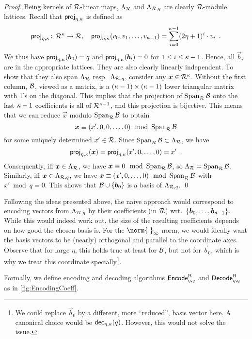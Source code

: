 \begin{proof}
Being kernels of $\mathcal{R}$-linear maps, $\Lambda_{\mathcal{R}}$ and $\Lambda_{\mathcal{R},q}$ are clearly $\mathcal{R}$-module lattices. Recall that $\mathsf{proj}_{\eta,\kappa}$ is defined as
\[
\mathsf{proj}_{\eta,\kappa}\colon\,\mathcal{R}^\kappa\to\mathcal{R}, \quad \mathsf{proj}_{\eta,\kappa}(v_0,v_1,\ldots, v_{\kappa-1}) = \sum_{i=0}^{\kappa-1} (2\eta+1)^i \cdot v_i\enspace.
\]
We thus have $\mathsf{proj}_{\eta,\kappa}(\boldsymbol{b}_0) = q$ and $\mathsf{proj}_{\eta,\kappa}(\boldsymbol{b}_i) = 0$ for $1\leq i \leq \kappa-1$.
Hence, all $\vec{b}_i$ are in the appropriate lattices.
They are also clearly linearly independent.
To show that they also span $\Lambda_{\mathcal{R}}$ resp.\ $\Lambda_{\mathcal{R},q}$, consider any $\boldsymbol{x}\in\mathcal{R}^\kappa$.
Without the first column, $\mathcal{B}$, viewed as a matrix, is a $(\kappa-1)\times (\kappa-1)$ lower triangular matrix with 1's on the diagonal.
This implies that the projection of $\operatorname*{Span}_{\mathcal{R}}\mathcal{B}$ onto the last $\kappa-1$ coefficients is all of $\mathcal{R}^{\kappa-1}$, and this projection is bijective.
This means that we can reduce $\vec{x}$ modulo $\operatorname*{Span}_{\mathcal{R}} \mathcal{B}$ to obtain
\[
  \boldsymbol{x}\equiv (x',0,0,\ldots, 0) \mod {\operatorname*{Span}}\nolimits_{\mathcal{R}}\mathcal{B}
\]
for some uniquely determined $x'\in\mathcal{R}$.
Since $\operatorname*{Span}_{\mathcal{R}}\mathcal{B}\subset \Lambda_{\mathcal{R}}$, we have 
\[
 \mathsf{proj}_{\eta,\kappa}(\boldsymbol{x}) = \mathsf{proj}_{\eta,\kappa}(x',0,\ldots, 0) = x'\enspace. 
\]
Consequently, iff $\boldsymbol{x}\in\Lambda_{\mathcal{R}}$, we have $\boldsymbol{x}\equiv 0 \mod {\operatorname*{Span}}_{\mathcal{R}}\mathcal{B}$, so $\Lambda_{\mathcal{R}} = \operatorname*{Span}_{\mathcal{R}}\mathcal{B}$.
Similarly, iff $\boldsymbol{x}\in\Lambda_{\mathcal{R},q}$, we have $\boldsymbol{x}\equiv (x',0,\ldots, 0) \mod {\operatorname*{Span}}_{\mathcal{R}}\mathcal{B}$ with $x'\bmod q = 0$. This shows that $\mathcal{B}\cup\{\boldsymbol{b}_0\}$ is a basis of $\Lambda_{\mathcal{R},q}$.
\qed
\end{proof}
Following the ideas presented above, the naive approach would correspond to encoding vectors from $\Lambda_{\mathcal{R},q}$ by their coefficients (in $\mathcal{R}$) wrt.\ $\{\boldsymbol{b}_0,\ldots,\boldsymbol{b}_{\kappa-1}\}$.
While this would indeed work out, the size of the resulting coefficients depends on how good the chosen basis is.
For the $\norm{.}_\infty$-norm, we would ideally want the basis vectors to be (nearly) orthogonal and parallel to the coordinate axes.
Observe that for large $\eta$, this holds true at least for $\mathcal{B}$, but not for $\vec{b}_0$, which is why we treat this coordinate specially\footnote{We could replace $\vec{b}_0$ by a different, more ``reduced'', basis vector here. A canonical choice would be $\mathsf{dec}_{\eta,\kappa}(q)$. However, this would not solve the issue.}.

Formally, we define encoding and decoding algorithms $\mathsf{Encode}^{\textup{B}}_{\eta,q}$ and $\mathsf{Decode}^{\textup{B}}_{\eta,q}$ as in \autoref{fig:EncodingCoeff}.

